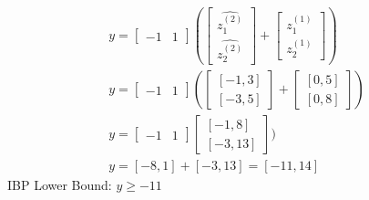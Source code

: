 \documentclass{article}
\begin{document}
\begin{align}
y = \begin{bmatrix}-1 & 1 \end{bmatrix} (\begin{bmatrix}\hat{z^{(2)}_1} \\ \hat{z^{(2)}_2} \end{bmatrix}+\begin{bmatrix}z^{(1)}_1 \\ z^{(1)}_2 \end{bmatrix})\\
y = \begin{bmatrix}-1 & 1 \end{bmatrix} (\begin{bmatrix}[-1,3] \\ [-3,5] \end{bmatrix}+\begin{bmatrix}[0,5] \\ [0,8]\end{bmatrix})\\
y = \begin{bmatrix}-1 & 1 \end{bmatrix} \begin{bmatrix}[-1,8] \\ [-3,13]\end{bmatrix})\\
y = [-8,1] + [-3,13] = [-11,14]
\end{align}
IBP Lower Bound: $y\geq -11$
\end{document}
